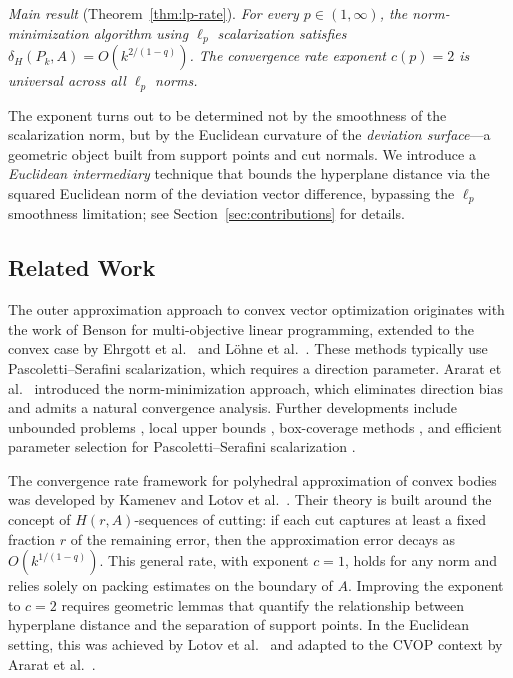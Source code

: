 \documentclass[11pt]{article}
\begin{document}
\medskip
\noindent \emph{Main result} (Theorem~\ref{thm:lp-rate}). \textit{For every $p \in (1, \infty)$, the norm-minimization algorithm using $\ell_p$ scalarization satisfies $\delta_H(P_k, A) = O(k^{2/(1-q)})$. The convergence rate exponent $c(p) = 2$ is universal across all $\ell_p$ norms.}
\medskip

The exponent turns out to be determined not by the smoothness of the scalarization norm, but by the Euclidean curvature of the \emph{deviation surface}---a geometric object built from support points and cut normals. We introduce a \emph{Euclidean intermediary} technique that bounds the hyperplane distance via the squared Euclidean norm of the deviation vector difference, bypassing the $\ell_p$ smoothness limitation; see Section~\ref{sec:contributions} for details.

\subsection{Related Work}\label{sec:related}

The outer approximation approach to convex vector optimization originates with the work of Benson \cite{Benson1998} for multi-objective linear programming, extended to the convex case by Ehrgott et al.\ \cite{Ehrgott2011} and L\"ohne et al.\ \cite{Lohne2011,Lohne2014}. These methods typically use Pascoletti--Serafini scalarization, which requires a direction parameter. Ararat et al.\ \cite{Ararat2022} introduced the norm-minimization approach, which eliminates direction bias and admits a natural convergence analysis. Further developments include unbounded problems \cite{Wagner2023}, local upper bounds \cite{Eichfelder2026}, box-coverage methods \cite{Eichfelder2022}, and efficient parameter selection for Pascoletti--Serafini scalarization \cite{Keskin2023}.

The convergence rate framework for polyhedral approximation of convex bodies was developed by Kamenev \cite{Kamenev1992,Kamenev2002} and Lotov et al.\ \cite{Lotov2004}. Their theory is built around the concept of $H(r,A)$-sequences of cutting: if each cut captures at least a fixed fraction $r$ of the remaining error, then the approximation error decays as $O(k^{1/(1-q)})$. This general rate, with exponent $c = 1$, holds for any norm and relies solely on packing estimates on the boundary of $A$. Improving the exponent to $c = 2$ requires geometric lemmas that quantify the relationship between hyperplane distance and the separation of support points. In the Euclidean setting, this was achieved by Lotov et al.\ \cite[Chapter~8]{Lotov2004} and adapted to the CVOP context by Ararat et al.\ \cite[Section~7]{Ararat2024}.
\end{document}
